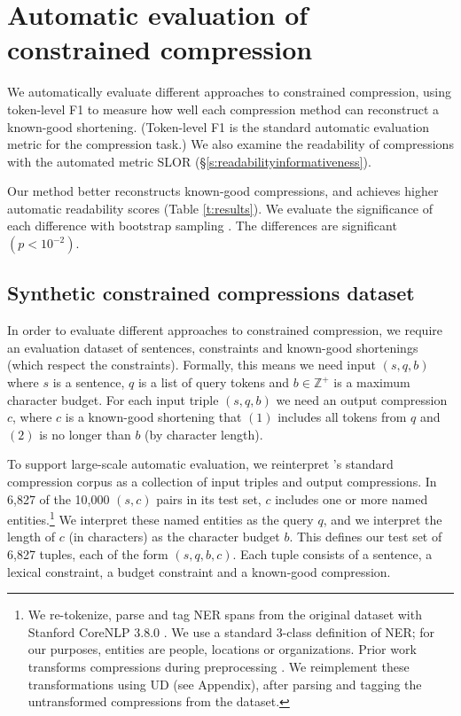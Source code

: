 \documentclass[11pt,a4paper]{article}
\begin{document}
\section{Automatic evaluation of constrained compression}\label{s:autoeval}

We automatically evaluate different approaches to constrained compression, using token-level F1 to measure how well each compression method can reconstruct a known-good shortening. (Token-level F1 is the standard automatic evaluation metric for the compression task.) We also examine the readability of compressions with the automated metric SLOR (\S\ref{s:readabilityinformativeness}). 

Our method better reconstructs known-good compressions, and achieves higher automatic readability scores (Table \ref{t:results}). We evaluate the significance of each difference with bootstrap sampling \cite{D12-1091}. The differences are significant {\small $(p < 10^{-2})$}. 

\subsection{Synthetic constrained compressions dataset}

In order to evaluate different approaches to constrained compression, we require an evaluation dataset of sentences, constraints and known-good shortenings (which respect the constraints). Formally, this means we need input $(s, q, b)$ where $s$ is a sentence, $q$ is a list of query tokens and $b \in \mathbb{Z}^{+}$ is a maximum character budget. For each input triple $(s,q,b)$ we need an output compression $c$, where $c$ is a known-good shortening that $(1)$ includes all tokens from $q$ and $(2)$ is no longer than $b$ (by character length). 

To support large-scale automatic evaluation, we reinterpret 
\citeauthor{filippova2013overcoming}'s
standard compression corpus
as a collection of input triples and output compressions.
In 6,827 of the 10,000 $(s,c)$ pairs in its test set,
$c$ includes one or more named entities.\footnote{We re-tokenize, parse and tag NER spans from the original dataset with Stanford CoreNLP 3.8.0 \cite{corenlp}. We use a standard 3-class definition of NER; for our purposes, entities are people, locations or organizations. Prior work transforms compressions during preprocessing \cite{filippova2013overcoming}. We reimplement these transformations using UD (see Appendix), after parsing and tagging the untransformed compressions from the dataset.}
We interpret these named entities as the query $q$,
and we interpret the length of $c$ (in characters) as the character budget $b$.
This defines our test set of 6,827 tuples, each of the form $(s,q,b,c)$. Each tuple consists of a sentence, a lexical constraint, a budget constraint and a
known-good compression.
\end{document}
